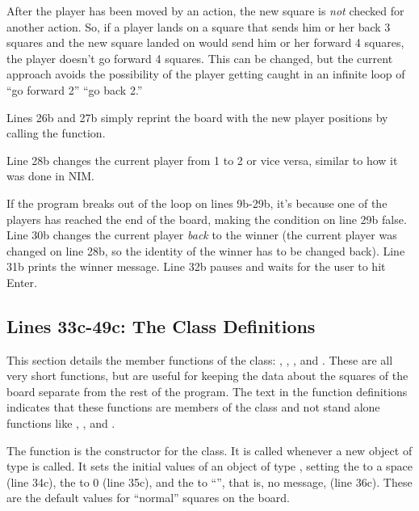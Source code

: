 After the player has been moved by an action, the new square is \emph{not} checked for another action.  So, if a player lands on a square that sends him or her back 3 squares and the new square landed on would send him or her forward 4 squares, the player doesn't go forward 4 squares.  This can be changed, but the current approach avoids the possibility of the player getting caught in an infinite loop of ``go forward 2'' ``go back 2.'' 


Lines 26b and 27b simply reprint the board with the new player positions by calling the  function.


Line 28b changes the current player from 1 to 2 or vice versa, similar to how it was done in NIM.


If the program breaks out of the  loop on lines 9b-29b, it's because one of the players has reached the end of the board, making the condition on line 29b false.  Line 30b changes the current player \emph{back} to the winner (the current player was changed on line 28b, so the identity of the winner has to be changed back).  Line 31b prints the winner message.  Line 32b pauses and waits for the user to hit Enter.  

\subsection{Lines 33c-49c: The  Class Definitions}

This section details the member functions of the  class: , , , and .  These are all very short functions, but are useful for keeping the data about the squares of the board separate from the rest of the program.  The text  in the function definitions indicates that these functions are members of the  class and not stand alone functions like , , and .


The function  is the constructor for the  class.  It is called whenever a new object of type  is called.  It sets the initial values of an object of type , setting the  to a space (line 34c), the  to 0 (line 35c), and the  to ``'', that is, no message, (line 36c).  These are the default values for ``normal'' squares on the board.

